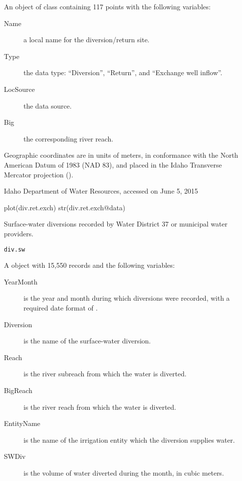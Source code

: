 \documentclass[letterpaper]{book}
\begin{document}
\begin{Format}
An object of  class containing 117 points with the following variables:
\begin{description}

\item[Name] a local name for the diversion/return site.
\item[Type] the data type: ``Diversion'', ``Return'', and ``Exchange well inflow''.
\item[LocSource] the data source.
\item[Big] the corresponding river reach.

\end{description}

Geographic coordinates are in units of meters, in conformance with the North American Datum of 1983 (NAD 83), and placed in the
Idaho Transverse Mercator projection ().
\end{Format}
%
\begin{Source}\relax
Idaho Department of Water Resources, accessed on June 5, 2015
\end{Source}
%
\begin{Examples}
\begin{ExampleCode}
plot(div.ret.exch)
str(div.ret.exch@data)
\end{ExampleCode}
\end{Examples}
%
\begin{Description}\relax
Surface-water diversions recorded by Water District 37 or municipal water providers.
\end{Description}
%
\begin{Usage}
\begin{verbatim}
div.sw
\end{verbatim}
\end{Usage}
%
\begin{Format}
A  object with 15,550 records and the following variables:
\begin{description}

\item[YearMonth] is the year and month during which diversions were recorded, with a required date format of .
\item[Diversion] is the name of the surface-water diversion.
\item[Reach] is the river subreach from which the water is diverted.
\item[BigReach] is the river reach from which the water is diverted.
\item[EntityName] is the name of the irrigation entity which the diversion supplies water.
\item[SWDiv] is the volume of water diverted during the month, in cubic meters.

\end{description}

\end{Format}
\end{document}
